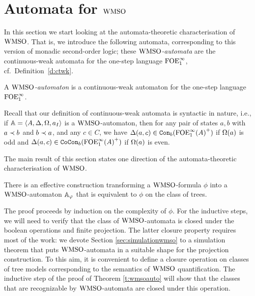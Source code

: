 
\section{Automata for $\wmso$}
   \label{sec:autwmso}

In this section we start looking at the automata-theoretic characterisation of
$\wmso$.
That is, we introduce the following automata, corresponding to this version of
monadic second-order logic; these \emph{$\wmso$-automata} are the continuous-weak
automata for the one-step language $\ofoei$, cf.~Definition~\ref{d:ctwk}.

\begin{definition}
A \emph{$\wmso$-automaton} is a continuous-weak automaton for the one-step
language $\ofoei$.
\end{definition}

Recall that our definition of continuous-weak automata is syntactic in nature,
i.e., if $\bbA = \tup{A,\tmap,\pmap,a_I}$ is a $\wmso$-automaton, then for any
pair of states $a,b$ with $a \ord b$ and $b \ord a$, and any $c\in C$, we have
$\tmap(a,c) \in \cont{{\ofoei(A)}^+}{b}$ if $\pmap(a)$ is odd and $\tmap(a,c)
\in \cocont{{\ofoei(A)}^+}{b}$ if $\pmap(a)$ is even.

The main result of this section states one direction of the automata-theoretic
characterisation of $\wmso$.

\begin{theorem}
\label{t:wmsoauto}
There is an effective construction transforming a $\wmso$-formula $\phi$
into a $\wmso$-automaton $\bbA_{\phi}$ that is equivalent
to $\phi$ on the class of trees.
\end{theorem}

The proof proceeds by induction on the complexity of
$\phi$. For the inductive steps, we will need to verify that the class of
$\wmso$-automata is closed under the boolean operations and finite projection.
The latter closure property requires most of the work: we devote
Section \ref{sec:simulationwmso} to a simulation theorem that puts
$\wmso$-automata in a suitable shape for the projection construction.
%
To this aim, it is convenient to define a closure operation on classes of 
tree models corresponding to the semantics of $\wmso$ quantification.
The inductive step of the proof of Theorem \ref{t:wmsoauto} will show that 
the classes that are recognizable by $\wmso$-automata are closed under this 
operation.

